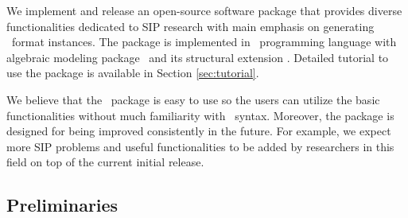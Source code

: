 We implement and release an open-source software package that provides diverse functionalities dedicated to SIP research with main emphasis on generating \smps\ format instances. The package is implemented in \julia\ programming language with algebraic modeling package \jump\ and its structural extension \structjump. Detailed tutorial to use the package is available in Section \ref{sec:tutorial}. 

We believe that the \siplibtwo\ package is easy to use so the users can utilize the basic functionalities without much familiarity with \julia\ syntax. Moreover, the package is designed for being improved consistently in the future. For example, we expect more SIP problems and useful functionalities to be added by researchers in this field on top of the current initial release.
\subsection{Preliminaries}
